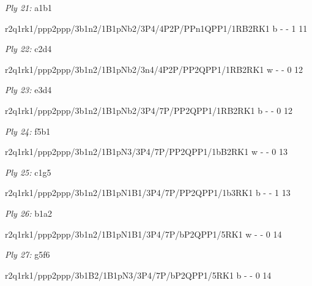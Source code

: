 \documentclass{article}
\begin{document}
\showboard

\bigskip

\emph{Ply 21:} a1b1


r2q1rk1/ppp2ppp/3b1n2/1B1pNb2/3P4/4P2P/PPn1QPP1/1RB2RK1 b - - 1 11


\showboard

\bigskip

\emph{Ply 22:} c2d4

r2q1rk1/ppp2ppp/3b1n2/1B1pNb2/3n4/4P2P/PP2QPP1/1RB2RK1 w - - 0 12


\showboard

\bigskip

\emph{Ply 23:} e3d4


r2q1rk1/ppp2ppp/3b1n2/1B1pNb2/3P4/7P/PP2QPP1/1RB2RK1 b - - 0 12


\showboard

\bigskip

\emph{Ply 24:} f5b1

r2q1rk1/ppp2ppp/3b1n2/1B1pN3/3P4/7P/PP2QPP1/1bB2RK1 w - - 0 13


\showboard

\bigskip

\emph{Ply 25:} c1g5


r2q1rk1/ppp2ppp/3b1n2/1B1pN1B1/3P4/7P/PP2QPP1/1b3RK1 b - - 1 13


\showboard

\bigskip

\emph{Ply 26:} b1a2

r2q1rk1/ppp2ppp/3b1n2/1B1pN1B1/3P4/7P/bP2QPP1/5RK1 w - - 0 14


\showboard

\bigskip

\emph{Ply 27:} g5f6


r2q1rk1/ppp2ppp/3b1B2/1B1pN3/3P4/7P/bP2QPP1/5RK1 b - - 0 14

\end{document}
